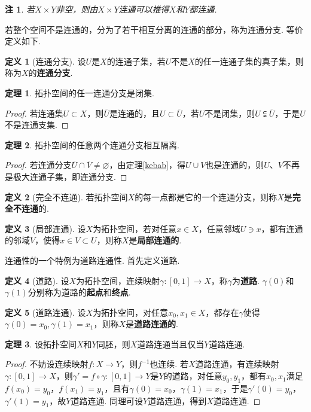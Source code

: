 \documentclass[12pt]{ctexart}
\theoremstyle{definition}
\newtheorem{definition}{定义}
\newtheorem{theorem}{定理}
\theoremstyle{plain}
\newtheorem*{remark}{注}
\begin{document}
	\begin{remark}
		若$X\times Y$非空，则由$X\times Y$连通可以推得$X$和$Y$都连通.
	\end{remark}
	若整个空间不是连通的，分为了若干相互分离的连通的部分，称为连通分支. 等价定义如下.
	\begin{definition}[连通分支]
		设$U$是$X$的连通子集，若$U$不是$X$的任一连通子集的真子集，则称为$X$的\textbf{连通分支}.
	\end{definition}
	\begin{theorem}
		拓扑空间的任一连通分支是闭集.
	\end{theorem}
	\begin{proof}
		若连通集$U\subset X$，则$\overline{U}$是连通的，且$U\subset\overline{U}$，若$U$不是闭集，则$U\subsetneqq\overline{U}$，于是$U$不是连通支集.
	\end{proof}
	\begin{theorem}
		拓扑空间的任意两个连通分支相互隔离.
	\end{theorem}
	\begin{proof}
		若连通分支$\overline{U}\cap \overline{V}\neq\varnothing$，由定理\ref{kebab}，得$U\cup V$也是连通的，则$U$、$V$不再是极大连通子集，即连通分支.
	\end{proof}
	\begin{definition}[完全不连通]
		若拓扑空间$X$的每一点都是它的一个连通分支，则称$X$是\textbf{完全不连通}的.
	\end{definition}
	\begin{definition}[局部连通]
		设$X$为拓扑空间，若对任意$x\in X$，任意邻域$U\ni x$，都有连通的邻域$V$，使得$x\in V\subset U$，则称$X$是\textbf{局部连通的}.
	\end{definition}
	连通性的一个特例为道路连通性. 首先定义道路.
	\begin{definition}[道路]
		设$X$为拓扑空间，连续映射$\gamma:\left[0,1\right]\to X$，称$\gamma$为\textbf{道路}. $\gamma(0)$和$\gamma(1)$分别称为道路的\textbf{起点}和\textbf{终点}.
	\end{definition}
	\begin{definition}[道路连通]
		设$X$为拓扑空间，对任意$x_0,x_1\in X$，都存在$\gamma$使得$\gamma(0)=x_0,\gamma(1)=x_1$，则称$X$是\textbf{道路连通的}.
	\end{definition}
	\begin{theorem}
		设拓扑空间$X$和$Y$同胚，则$X$道路连通当且仅当$Y$道路连通.
	\end{theorem}
	\begin{proof}
		不妨设连续映射$f:X\to Y$，则$f^{-1}$也连续. 若$X$道路连通，有连续映射$\gamma:\left[0,1\right]\to X$，则$\gamma'=f\circ\gamma:\left[0,1\right]\to Y$是$Y$的道路，对任意$y_0,y_1$，都有$x_0,x_1$满足$f(x_0)=y_0$，$f(x_1)=y_1$，且有$\gamma(0)=x_0$，$\gamma(1)=x_1$，于是$\gamma'(0)=y_0$，$\gamma'(1)=y_1$，故$Y$道路连通. 同理可设$Y$道路连通，得到$X$道路连通.
	\end{proof}
\end{document}
